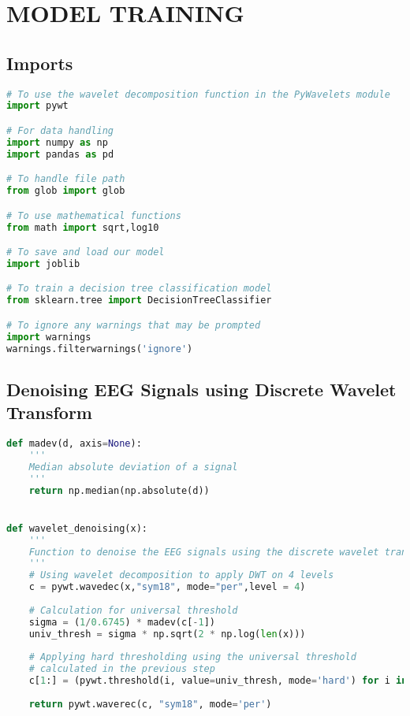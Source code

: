 \hypertarget{model-training}{%
\section{MODEL TRAINING}\label{model-training}}

\hypertarget{imports}{%
\subsection{Imports}\label{imports}}

\begin{lstlisting}[language=Python]
# To use the wavelet decomposition function in the PyWavelets module
import pywt  

# For data handling
import numpy as np
import pandas as pd

# To handle file path
from glob import glob

# To use mathematical functions
from math import sqrt,log10

# To save and load our model 
import joblib

# To train a decision tree classification model
from sklearn.tree import DecisionTreeClassifier

# To ignore any warnings that may be prompted
import warnings
warnings.filterwarnings('ignore')
\end{lstlisting}

\hypertarget{denoising-eeg-signals-using-discrete-wavelet-transform}{%
\subsection{Denoising EEG Signals using Discrete Wavelet
Transform}\label{denoising-eeg-signals-using-discrete-wavelet-transform}}

\begin{lstlisting}[language=Python]
def madev(d, axis=None):
    '''
    Median absolute deviation of a signal
    ''' 
    return np.median(np.absolute(d))


def wavelet_denoising(x):
    ''' 
    Function to denoise the EEG signals using the discrete wavelet transform. 
    '''
    # Using wavelet decomposition to apply DWT on 4 levels
    c = pywt.wavedec(x,"sym18", mode="per",level = 4)
    
    # Calculation for universal threshold
    sigma = (1/0.6745) * madev(c[-1])
    univ_thresh = sigma * np.sqrt(2 * np.log(len(x)))
    
    # Applying hard thresholding using the universal threshold 
    # calculated in the previous step
    c[1:] = (pywt.threshold(i, value=univ_thresh, mode='hard') for i in c[1:])
    
    return pywt.waverec(c, "sym18", mode='per')
\end{lstlisting}

